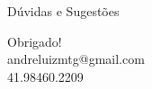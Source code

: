\documentclass[10pt]{beamer}
\begin{document}
	
{
	\begin{frame}[standout]
	Dúvidas e Sugestões
	\end{frame}
}
	
	
	{
		\begin{frame}[standout]
			Obrigado! \\
			andreluizmtg@gmail.com\\
			41.98460.2209
		\end{frame}
	}
	
	
\end{document}
